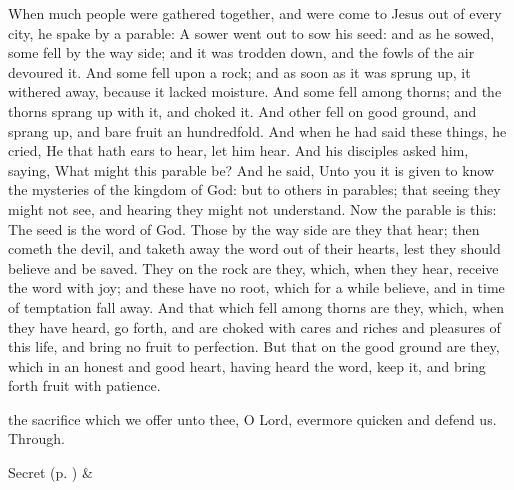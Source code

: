  When much people were gathered together, and were come to Jesus out of every city, he spake by a parable: A sower went out to sow his seed: and as he sowed, some fell by the way side; and it was trodden down, and the fowls of the air devoured it. And some fell upon a rock; and as soon as it was sprung up, it withered away, because it lacked moisture. And some fell among thorns; and the thorns sprang up with it, and choked it. And other fell on good ground, and sprang up, and bare fruit an hundredfold. And when he had said these things, he cried, He that hath ears to hear, let him hear. And his disciples asked him, saying, What might this parable be? And he said, Unto you it is given to know the mysteries of the kingdom of God: but to others in parables; that seeing they might not see, and hearing they might not understand. Now the parable is this: The seed is the word of God. Those by the way side are they that hear; then cometh the devil, and taketh away the word out of their hearts, lest they should believe and be saved. They on the rock are they, which, when they hear, receive the word with joy; and these have no root, which for a while believe, and in time of temptation fall away. And that which fell among thorns are they, which, when they have heard, go forth, and are choked with cares and riches and pleasures of this life, and bring no fruit to perfection. But that on the good ground are they, which in an honest and good heart, having heard the word, keep it, and bring forth fruit with patience.

\secret
{} the sacrifice which we offer unto thee, O Lord, evermore quicken and defend us. Through.


\begin{rubric}
     Secret  (p. \pageref{SPSaints}) \&  
\end{rubric}

